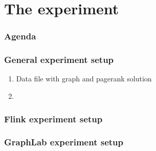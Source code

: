 \section{The experiment}

\begin{frame}
\frametitle{Agenda}
\tableofcontents[currentsection]
\end{frame}

\begin{frame}
\frametitle{General experiment setup}
\begin{enumerate}
\item Data file with graph and pagerank solution
\item[]
\end{enumerate}
\end{frame}

\begin{frame}
\frametitle{Flink experiment setup}
\end{frame}

\begin{frame}
\frametitle{GraphLab experiment setup}
\end{frame}
